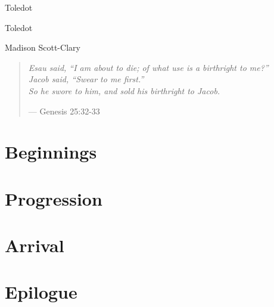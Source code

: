 \documentclass[11pt]{memoir}
\begin{document}
  \frontmatter

  \thispagestyle{empty}
  \null
  \vfill
  \begin{flushright}
    \DisplayFont Toledot
  \end{flushright}
  \vfill
  \cleardoublepage

  \pagestyle{plain}

  \doublespacing

  \begin{flushright}
    \null
    \vfill
    {\Huge\DisplayFont Toledot}

    \vfill

    {\Large\DisplayFont Madison Scott-Clary}
  \end{flushright}
  \thispagestyle{empty}

  \newpage

  

  \newpage
  \null
  \cleardoublepage



  \mainmatter

  \pagestyle{ourbook}

  \cleardoublepage
  \null
  \thispagestyle{empty}
  \vfill
  \begin{quote}
    \small
    \emph{Esau said, ``I am about to die; of what use is a birthright to me?'' \\
    Jacob said, ``Swear to me first.'' \\
    So he swore to him, and sold his birthright to Jacob.}

    --- Genesis 25:32-33
  \end{quote}
  \vfill

  \part{Beginnings}
  

  \part{Progression}
  

  \part{Arrival}
  

  \part*{Epilogue}
  

  \backmatter

  \markboth{}{}


\end{document}
